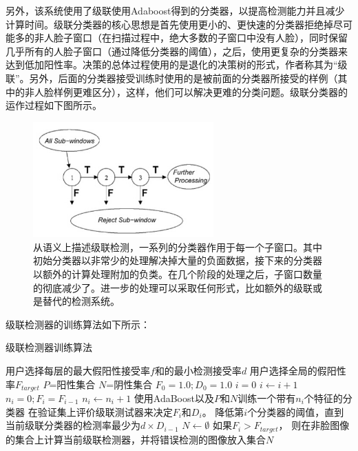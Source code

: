 另外，该系统使用了级联使用Adaboost得到的分类器，以提高检测能力并且减少计算时间。级联分类器的核心思想是首先使用更小的、更快速的分类器拒绝掉尽可能多的非人脸子窗口（在扫描过程中，绝大多数的子窗口中没有人脸），同时保留几乎所有的人脸子窗口（通过降低分类器的阈值），之后，使用更复杂的分类器来达到低加阳性率。决策的总体过程使用的是退化的决策树的形式，作者称其为“级联”。另外，后面的分类器接受训练时使用的是被前面的分类器所接受的样例（其中的非人脸样例更难区分），这样，他们可以解决更难的分类问题。级联分类器的运作过程如下图所示。
\begin{figure}[H]
    \centering 
    \includegraphics[width=0.618\textwidth]{image/2_1_1_4.jpg}    
    \caption{从语义上描述级联检测，一系列的分类器作用于每一个子窗口。其中初始分类器以非常少的处理解决掉大量的负面数据，接下来的分类器以额外的计算处理附加的负类。在几个阶段的处理之后，子窗口数量的彻底减少了。进一步的处理可以采取任何形式，比如额外的级联或是替代的检测系统。}
    \label{logic}
\end{figure}
级联检测器的训练算法如下所示：
\begin{algorithm}
\caption{级联检测器训练算法}
    \begin{algorithmic}[1]
    \State 用户选择每层的最大假阳性接受率$f$和的最小检测接受率$d$
    \State 用户选择全局的假阳性率$F_{target}$
    \State $P$=阳性集合
    \State $N$=阴性集合
    \State $F_0=1.0;D_0=1.0$
    \State $i=0$
        \State $i \leftarrow i+1$
        \State $n_i=0; F_i=F_{i-1}$
            \State $n_i\leftarrow n_i+1$
            \State 使用AdaBoost以及$P$和$N$训练一个带有$n_i$个特征的分类器
            \State 在验证集上评价级联测试器来决定$F_i$和$D_i$。
            \State 降低第$i$个分类器的阈值，直到当前级联分类器的检测率最少为$d\times D_{i-1}$
        \EndWhile
        \State $N\leftarrow \emptyset$
        \State 如果$F_i>F_{target}$， 则在非脸图像的集合上计算当前级联检测器，并将错误检测的图像放入集合$N$
    \EndWhile
    \end{algorithmic}
\end{algorithm}

